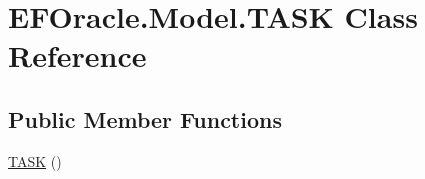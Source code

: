 \hypertarget{class_e_f_oracle_1_1_model_1_1_t_a_s_k}{}\section{E\+F\+Oracle.\+Model.\+T\+A\+SK Class Reference}
\label{class_e_f_oracle_1_1_model_1_1_t_a_s_k}
\subsection*{Public Member Functions}
\begin{DoxyCompactItemize}
\item 
\hyperlink{class_e_f_oracle_1_1_model_1_1_t_a_s_k_a8ac2d630efc4ee5359cdb60f198c25cb}{T\+A\+SK} ()
\end{DoxyCompactItemize}
